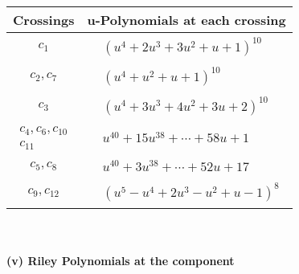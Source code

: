 \documentclass[1p]{elsarticle_modified}
\theoremstyle{definition}
\begin{document}
\begin{tabular}{m{50pt}|m{274pt}}
Crossings & \hspace{64pt}u-Polynomials at each crossing \\
\hline $$\begin{aligned}c_{1}\end{aligned}$$&$\begin{aligned}
&(u^4+2 u^3+3 u^2+u+1)^{10}
\end{aligned}$\\
\hline $$\begin{aligned}c_{2},c_{7}\end{aligned}$$&$\begin{aligned}
&(u^4+u^2+u+1)^{10}
\end{aligned}$\\
\hline $$\begin{aligned}c_{3}\end{aligned}$$&$\begin{aligned}
&(u^4+3 u^3+4 u^2+3 u+2)^{10}
\end{aligned}$\\
\hline $$\begin{aligned}c_{4},c_{6},c_{10}\\c_{11}\end{aligned}$$&$\begin{aligned}
&u^{40}+15 u^{38}+\cdots+58 u+1
\end{aligned}$\\
\hline $$\begin{aligned}c_{5},c_{8}\end{aligned}$$&$\begin{aligned}
&u^{40}+3 u^{38}+\cdots+52 u+17
\end{aligned}$\\
\hline $$\begin{aligned}c_{9},c_{12}\end{aligned}$$&$\begin{aligned}
&(u^5- u^4+2 u^3- u^2+u-1)^8
\end{aligned}$\\
\hline
\end{tabular}\\~\\
\newpage\renewcommand{\arraystretch}{1}
\flushleft \textbf{(v) Riley Polynomials at the component}\newline \\
\end{document}
